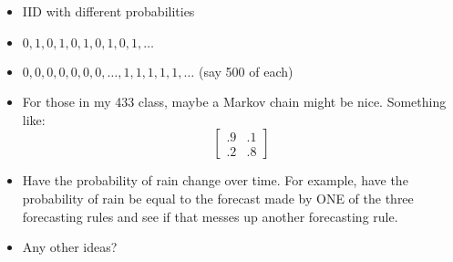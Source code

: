 \documentclass[11pt]{article}
\begin{document}
\begin{enumerate}
\begin{enumerate}
\begin{itemize}
\item IID with different probabilities
\item $0,1,0,1,0,1,0,1,0,1,\ldots$
\item $0,0,0,0,0,0,0,\ldots,1,1,1,1,1,\ldots$ (say 500 of each)
\item For those in my 433 class, maybe a Markov chain might be
nice. Something like:
\begin{displaymath}
\left[\begin{array}{cc}.9 &.1\\.2 & .8
\end{array}
\right]
\end{displaymath}
\item Have the probability of rain change over time.  For example,
have the probability of rain be equal to the forecast made by ONE of
the three forecasting rules and see if that messes up another
forecasting rule.
\item Any other ideas?
\end{itemize}
\end{enumerate}


\end{enumerate}
\end{document}
